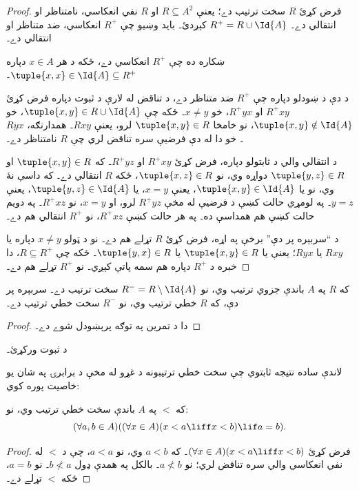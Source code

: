 \documentclass[../../../include/open-logic-section]{subfiles}
\begin{document}
\begin{proof}
فرض کړئ $R$ سخت ترتيب دے؛ يعنې $R \subseteq A^2$ او $R$ نفي
انعکاسي، نامتناظر او انتقالي دے۔ $R^+ = R \cup \Id{A}$ کېږدئ۔
بايد وښيو چې $R^+$ انعکاسي، ضد متناظر او انتقالي دے۔

ښکاره ده چې $R^+$ انعکاسي دے، ځکه د هر $x \in A$ دپاره
$\tuple{x, x} \in \Id{A} \subseteq R^+$۔

د دې د ښودلو دپاره چې $R^+$ ضد متناظر دے، د تناقض له لارې د ثبوت
دپاره فرض کړئ $R^+xy$ او $R^+yx$، خو $x \neq y$۔ ځکه چې
$\tuple{x,y} \in R \cup \Id{A}$، خو
$\tuple{x, y} \notin \Id{A}$، نو خامخا $\tuple{x, y} \in R$
لرو، يعنې $Rxy$۔ همدارنګه، $Ryx$۔ خو دا له دې فرضيې سره تناقض لري
چې $R$ نامتناظر دے۔

د انتقالي والي د ثابتولو دپاره، فرض کړئ $R^+xy$ او $R^+yz$۔
که $\tuple{x, y} \in R$ او $\tuple{y,z} \in R$ دواړه وي، نو
$\tuple{x, z} \in R$، ځکه $R$ انتقالي دے۔ که داسې نۀ وي، نو يا
$\tuple{x, y} \in \Id{A}$، يعنې $x = y$، يا
$\tuple{y, z} \in \Id{A}$، يعنې $y = z$۔ په لومړي حالت کښې د
فرضيې له مخې $R^+yz$ لرو، او $x = y$، نو $R^+xz$۔ په دويم
حالت کښې هم همداسې ده۔ په هر حالت کښې $R^+xz$، نو $R^+$ انتقالي
هم دے۔

د ``سربېره پر دې'' برخې په اړه، فرض کړئ $R$ تړلے هم دے۔ نو د ټولو
$x \neq y$ دپاره يا $Rxy$ يا $Ryx$؛ يعنې يا
$\tuple{x, y} \in R$ يا $\tuple{y, x} \in R$۔ ځکه چې
$R \subseteq R^+$، دا خبره د $R^+$ دپاره هم سمه پاتې کېږي۔ نو
$R^+$ تړلے هم دے۔
\end{proof}

\begin{prop}
که $R$ په $A$ باندې جزوي ترتيب وي، نو
$R^- = R \setminus \Id{A}$ سخت ترتيب دے۔ سربېره پر دې، که $R$
خطي ترتيب وي، نو $R^-$ سخت خطي ترتيب دے۔
\end{prop}

\begin{proof}
دا د تمرين په توګه پرېښودل شوے دے۔
\end{proof}

\begin{prob}
د  ثبوت ورکړئ۔
\end{prob}

لاندې ساده نتيجه ثابتوي چې سخت خطي ترتيبونه د غړو له مخې د
برابرۍ په شان يو خاصيت پوره کوي:

\begin{prop}
که $<$ په $A$ باندې سخت خطي ترتيب وي، نو:
\[
  (\forall a, b \in A)((\forall x \in A)(x < a \liff x < b) \lif a = b).
\]
\end{prop}

\begin{proof}
فرض کړئ $(\forall x \in A)(x < a \liff x < b)$۔ که $a < b$ وي،
نو $a < a$، چې د $<$ له نفي انعکاسي والي سره تناقض لري؛ نو
$a \nless b$۔ بالکل په همدې ډول $b \nless a$۔ نو $a = b$، ځکه
$<$ تړلے دے۔
\end{proof}
\end{document}
